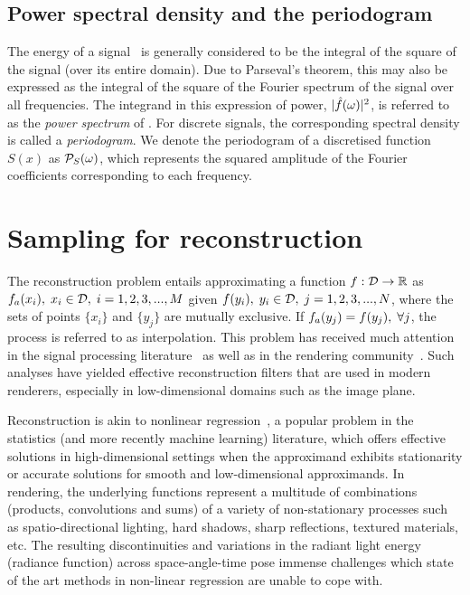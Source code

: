 \documentclass[11pt,fleqn]{book} %
\newcommand{\TBC} {\noindent [TO BE COMPLETED IN THE FINAL VERSION.] }
\begin{document}
\section{Power spectral density and the periodogram}
The energy of a signal \ifn\ is generally considered to be the integral of the square of the signal (over its entire domain). Due to Parseval's theorem, this may also be expressed as the integral of the square of the Fourier spectrum of the signal over all frequencies. The integrand in this expression of power, $|\hat{f}(\omega)|^2$, is referred to as the \textit{power spectrum} of \ifn. For discrete signals, the corresponding spectral density is called a \emph{periodogram}. We denote the periodogram of a discretised function $S(x)$ as $\mathcal{P}_{S}(\omega)$, which represents the squared amplitude of the Fourier coefficients corresponding to each frequency. 

\TBC
\chapter{Sampling for reconstruction}
The reconstruction problem entails approximating a function $f:\mathcal{D}\rightarrow\mathbb{R}$ as ${f}_a(x_i), \; x_i\in\mathcal{D}, \;i=1,2,3,...,M$ given $f(y_i), \; y_i \in \mathcal{D}, \;j=1,2,3,...,N$, where the sets of points $\{x_i\}$ and $\{y_j\}$ are mutually exclusive. If ${f}_a(y_j) = f(y_j),\;\forall j$, the process is referred to as interpolation. This problem has received much attention in the signal processing literature~\cite[chapters~5~\&~6]{engineering2008handbook} as well as in the rendering community~\cite{Wold85,Cook:1986:SSC,mitchell87a}. Such analyses have yielded effective reconstruction filters that are used in modern renderers, especially in low-dimensional domains such as the image plane.

Reconstruction is akin to nonlinear regression~\cite{GVK394929411}, a popular problem in the statistics (and more recently machine learning) literature, which offers effective solutions in high-dimensional settings when the approximand exhibits stationarity or accurate solutions for smooth and low-dimensional approximands. In rendering, the underlying functions represent a multitude of combinations (products, convolutions and sums) of a variety of non-stationary processes such as spatio-directional lighting, hard shadows, sharp reflections, textured materials, etc. The resulting discontinuities and variations in the radiant light energy (radiance function) across space-angle-time pose immense challenges which state of the art methods in non-linear regression are unable to cope with.
\end{document}
